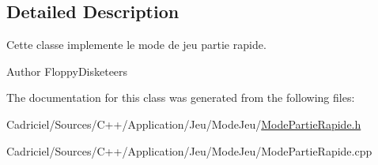 \subsection{Detailed Description}
Cette classe implemente le mode de jeu partie rapide. 

\begin{DoxyAuthor}{Author}
Floppy\-Disketeers 
\end{DoxyAuthor}


The documentation for this class was generated from the following files\-:\begin{DoxyCompactItemize}
\item 
Cadriciel/\-Sources/\-C++/\-Application/\-Jeu/\-Mode\-Jeu/\hyperlink{_mode_partie_rapide_8h}{Mode\-Partie\-Rapide.\-h}\item 
Cadriciel/\-Sources/\-C++/\-Application/\-Jeu/\-Mode\-Jeu/Mode\-Partie\-Rapide.\-cpp\end{DoxyCompactItemize}
